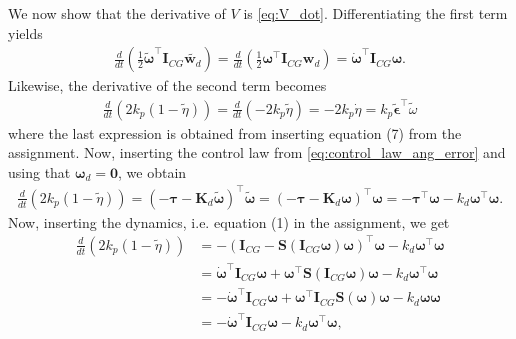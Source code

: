We now show that the derivative of $V$ is \ref{eq:V_dot}. Differentiating the first term yields
\begin{equation}\begin{aligned}
\label{eq:V_dot_first_term}
\frac{d}{dt}(\frac{1}{2}\tilde{\boldsymbol{\omega}}^\top \mathbf{I}_{CG}\tilde{\boldsymbol{w}_d}) =
\frac{d}{dt}(\frac{1}{2}\boldsymbol{\omega}^\top \mathbf{I}_{CG}\boldsymbol{w}_d) =
\dot{\boldsymbol{\omega}}^\top \mathbf{I}_{CG} \boldsymbol{\omega}.
\end{aligned}\end{equation}
Likewise, the derivative of the second term becomes
\begin{equation}\begin{aligned}
\frac{d}{dt}(2k_p(1-\tilde \eta))
= \frac{d}{dt}(-2k_p \tilde \eta)
= -2k_p \dot \eta
= k_p \tilde{\boldsymbol{\epsilon}}^\top \tilde{\omega}
\end{aligned}\end{equation}
where the last expression is obtained from inserting equation (7) from the assignment. Now, inserting the control law from \ref{eq:control_law_ang_error} and using that $\boldsymbol{\omega}_d = \mathbf{0}$, we obtain
\begin{equation}\begin{aligned}
\frac{d}{dt}(2k_p(1-\tilde \eta))
= (-\boldsymbol{\tau} - \mathbf{K}_d \tilde{\boldsymbol{\omega}})^\top \tilde{\boldsymbol{\omega}}
= (-\boldsymbol{\tau} - \mathbf{K}_d \boldsymbol{\omega})^\top \boldsymbol{\omega}
= -\boldsymbol{\tau}^\top \boldsymbol{\omega} -k_d \boldsymbol{\omega}^\top \boldsymbol{\omega}.
\end{aligned}\end{equation}
Now, inserting the dynamics, i.e. equation (1) in the assignment, we get
\begin{equation}\begin{aligned}
\label{eq:V_dot_second_term}
\frac{d}{dt}(2k_p(1-\tilde \eta))
&= -(\mathbf{I}_{CG} - \mathbf{S}(\mathbf{I}_{CG}\boldsymbol{\omega})\boldsymbol{\omega})^\top \boldsymbol{\omega} - k_d \boldsymbol{\omega}^\top\boldsymbol{\omega} \\
&= \dot{\boldsymbol{\omega}}^\top \mathbf{I}_{CG} \boldsymbol{\omega}
+ \boldsymbol{\omega}^\top \mathbf{S}(\mathbf{I}_{CG}\boldsymbol{\omega})\boldsymbol{\omega}
- k_d \boldsymbol{\omega}^\top \boldsymbol{\omega} \\
&= - \dot{\boldsymbol{\omega}}^\top \mathbf{I}_{CG}\boldsymbol{\omega}
+ \boldsymbol{\omega}^\top \mathbf{I}_{CG} \mathbf{S}(\boldsymbol{\omega})\boldsymbol{\omega}
- k_d\boldsymbol{\omega}\boldsymbol{\omega} \\
&= - \dot{\boldsymbol{\omega}}^\top \mathbf{I}_{CG}\boldsymbol{\omega}
- k_d\boldsymbol{\omega}^\top\boldsymbol{\omega},
\end{aligned}\end{equation}
